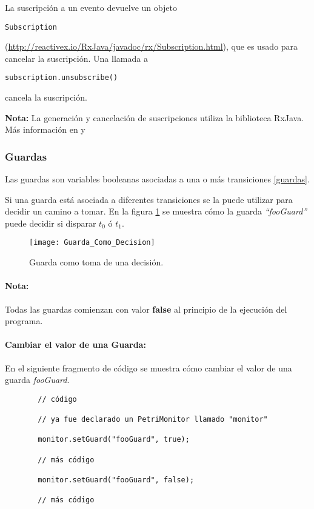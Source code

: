 La suscripción a un evento devuelve un objeto
\begin{verbatim}
Subscription
\end{verbatim} 
(\url{http://reactivex.io/RxJava/javadoc/rx/Subscription.html}),
que es usado para cancelar la suscripción.
Una llamada a
\begin{verbatim}
subscription.unsubscribe()
\end{verbatim} 
cancela la suscripción.

\begin{framed}
\textbf{Nota:} La generación y cancelación de suscripciones utiliza la
biblioteca RxJava. Más información en \cite{RxJava} y \cite{RxJavaJavadoc}
\end{framed}

\subsubsection{Guardas}

Las guardas son variables booleanas asociadas a una o más transiciones
\ref{guardas}.

Si una guarda está asociada a diferentes transiciones se la puede utilizar para
decidir un camino a tomar. En la figura \ref{fig:guarda_como_decision} se
muestra cómo la guarda \textit{``fooGuard''} puede decidir si disparar $t_{0}$ ó
$t_{1}$.

\begin{figure}[H]
  \centering
  \texttt{[image: Guarda\_Como\_Decision]}
  \caption{Guarda como toma de una decisión.}
  \label{fig:guarda_como_decision}
\end{figure}

\begin{framed}
\paragraph{Nota:} Todas las guardas comienzan con valor \textbf{false} al
principio de la ejecución del programa.
\end{framed}

\paragraph{Cambiar el valor de una Guarda:} En el siguiente fragmento de código
se muestra cómo cambiar el valor de una guarda \textit{fooGuard}.

\begin{figure}[H]
\centering
\begin{verbatim}
  // código
  
  // ya fue declarado un PetriMonitor llamado "monitor"
  
  monitor.setGuard("fooGuard", true);
  
  // más código
  
  monitor.setGuard("fooGuard", false);
  
  // más código
\end{verbatim}
\end{figure}

